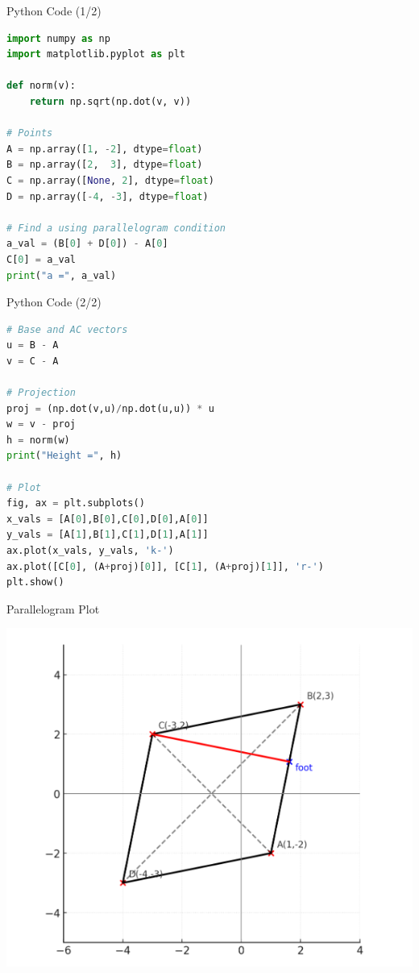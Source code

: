 \documentclass{beamer}
\begin{document}
    


\begin{frame}[fragile]{Python Code (1/2)}
\begin{lstlisting}[language=Python]
import numpy as np
import matplotlib.pyplot as plt

def norm(v):
    return np.sqrt(np.dot(v, v))

# Points
A = np.array([1, -2], dtype=float)
B = np.array([2,  3], dtype=float)
C = np.array([None, 2], dtype=float)
D = np.array([-4, -3], dtype=float)

# Find a using parallelogram condition
a_val = (B[0] + D[0]) - A[0]
C[0] = a_val
print("a =", a_val)
\end{lstlisting}
\end{frame}

\begin{frame}[fragile]{Python Code (2/2)}
\begin{lstlisting}[language=Python]
# Base and AC vectors
u = B - A
v = C - A

# Projection
proj = (np.dot(v,u)/np.dot(u,u)) * u
w = v - proj
h = norm(w)
print("Height =", h)

# Plot
fig, ax = plt.subplots()
x_vals = [A[0],B[0],C[0],D[0],A[0]]
y_vals = [A[1],B[1],C[1],D[1],A[1]]
ax.plot(x_vals, y_vals, 'k-')
ax.plot([C[0], (A+proj)[0]], [C[1], (A+proj)[1]], 'r-')
plt.show()
\end{lstlisting}
\end{frame}

\begin{frame}{Parallelogram Plot}
\begin{center}
\includegraphics[width=0.7\columnwidth]{figs/fig4.png}
\end{center}
\end{frame}
\end{document}
